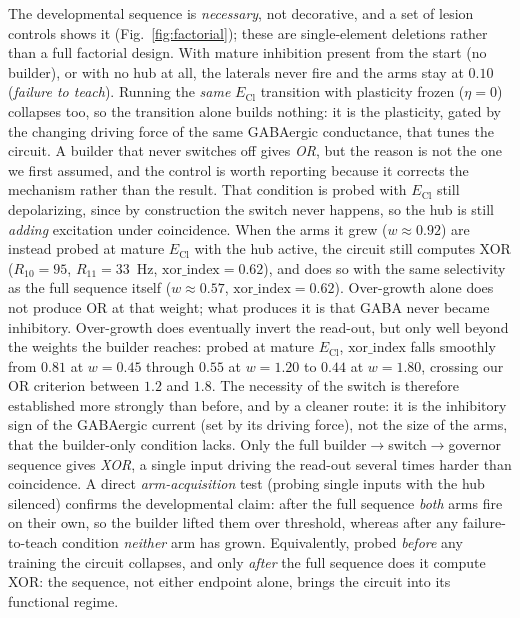 \documentclass[11pt,a4paper]{article}
\newcommand{\ECl}{E_{\mathrm{Cl}}}
\begin{document}
The developmental sequence is \emph{necessary}, not decorative, and a set of lesion controls shows it (Fig.~\ref{fig:factorial}); these are single-element deletions rather than a full factorial design. With mature inhibition present from the start (no builder), or with no hub at all, the laterals never fire and the arms stay at $0.10$ (\emph{failure to teach}). Running the \emph{same} $\ECl$ transition with plasticity frozen ($\eta=0$) collapses too, so the transition alone builds nothing: it is the plasticity, gated by the changing driving force of the same GABAergic conductance, that tunes the circuit. A builder that never switches off gives \emph{OR}, but the reason is not the one we first assumed, and the control is worth reporting because it corrects the mechanism rather than the result. That condition is probed with $\ECl$ still depolarizing, since by construction the switch never happens, so the hub is still \emph{adding} excitation under coincidence. When the arms it grew ($w\approx0.92$) are instead probed at mature $\ECl$ with the hub active, the circuit still computes XOR ($R_{10}=95$, $R_{11}=33$~Hz, $\mathrm{xor\_index}=0.62$), and does so with the same selectivity as the full sequence itself ($w\approx0.57$, $\mathrm{xor\_index}=0.62$). Over-growth alone does not produce OR at that weight; what produces it is that GABA never became inhibitory. Over-growth does eventually invert the read-out, but only well beyond the weights the builder reaches: probed at mature $\ECl$, $\mathrm{xor\_index}$ falls smoothly from $0.81$ at $w=0.45$ through $0.55$ at $w=1.20$ to $0.44$ at $w=1.80$, crossing our OR criterion between $1.2$ and $1.8$. The necessity of the switch is therefore established more strongly than before, and by a cleaner route: it is the inhibitory sign of the GABAergic current (set by its driving force), not the size of the arms, that the builder-only condition lacks. Only the full builder$\to$switch$\to$governor sequence gives \emph{XOR}, a single input driving the read-out several times harder than coincidence. A direct \emph{arm-acquisition} test (probing single inputs with the hub silenced) confirms the developmental claim: after the full sequence \emph{both} arms fire on their own, so the builder lifted them over threshold, whereas after any failure-to-teach condition \emph{neither} arm has grown. Equivalently, probed \emph{before} any training the circuit collapses, and only \emph{after} the full sequence does it compute XOR: the sequence, not either endpoint alone, brings the circuit into its functional regime.
\end{document}
